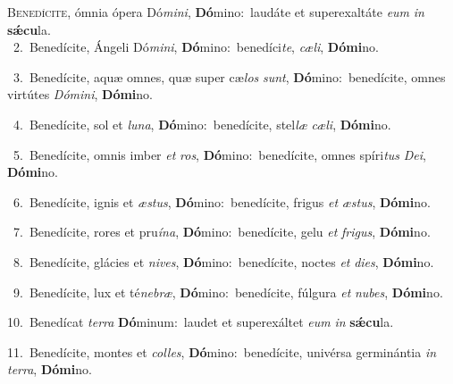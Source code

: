 \lettrine{\initial\textcolor{\initialcolor}{B}}{enedícite,} ómnia ópera Dó\-\textit{mi}\-\textit{ni}, \textbf{Dó}\-mino:~\star laudáte et superexaltáte \textit{e}\-\textit{um} \textit{in} \textbf{sǽ}\-\textbf{cu}la.\\
{\numbfont\textcolor{\numbcolor}{~2.}}~Benedícite, Ángeli Dó\-\textit{mi}\-\textit{ni}, \textbf{Dó}\-mino:~\star benedíci\-\textit{te}\-, \textit{cæ}\-\textit{li}, \textbf{Dó}\-\textbf{mi}no.\par
{\numbfont\textcolor{\numbcolor}{~3.}}~Benedícite, aquæ omnes, quæ super cæ\textit{los} \textit{sunt}\-, \textbf{Dó}\-mino:~\star benedícite, omnes virtútes \textit{Dó}\-\textit{mi}\textit{ni}, \textbf{Dó}\-\textbf{mi}no.\par
{\numbfont\textcolor{\numbcolor}{~4.}}~Benedícite, sol et \textit{lu}\-\textit{na}, \textbf{Dó}\-mino:~\star benedícite, stel\textit{læ} \textit{cæ}\-\textit{li}, \textbf{Dó}\-\textbf{mi}no.\par
{\numbfont\textcolor{\numbcolor}{~5.}}~Benedícite, omnis imber \textit{et} \textit{ros}\-, \textbf{Dó}\-mino:~\star benedícite, omnes spíri\textit{tus} \textit{De}\-\textit{i}, \textbf{Dó}\-\textbf{mi}no.\par
{\numbfont\textcolor{\numbcolor}{~6.}}~Benedícite, ignis et \textit{æs}\-\textit{tus}, \textbf{Dó}\-mino:~\star benedícite, frigus \textit{et} \textit{æs}\-\textit{tus}, \textbf{Dó}\-\textbf{mi}no.\par
{\numbfont\textcolor{\numbcolor}{~7.}}~Benedícite, rores et pru\-\textit{í}\-\textit{na}, \textbf{Dó}\-mino:~\star benedícite, gelu \textit{et} \textit{fri}\-\textit{gus}, \textbf{Dó}\-\textbf{mi}no.\par
{\numbfont\textcolor{\numbcolor}{~8.}}~Benedícite, glácies et \textit{ni}\-\textit{ves}, \textbf{Dó}\-mino:~\star benedícite, noctes \textit{et} \textit{di}\-\textit{es}, \textbf{Dó}\-\textbf{mi}no.\par
{\numbfont\textcolor{\numbcolor}{~9.}}~Benedícite, lux et té\-\textit{ne}\-\textit{bræ}, \textbf{Dó}\-mino:~\star benedícite, fúlgura \textit{et} \textit{nu}\-\textit{bes}, \textbf{Dó}\-\textbf{mi}no.\par
{\numbfont\textcolor{\numbcolor}{10.}}~Benedícat \textit{ter}\-\textit{ra} \textbf{Dó}\-minum:~\star laudet et superexáltet \textit{e}\-\textit{um} \textit{in} \textbf{sǽ}\-\textbf{cu}la.\par
{\numbfont\textcolor{\numbcolor}{11.}}~Benedícite, montes et \textit{col}\-\textit{les}, \textbf{Dó}\-mino:~\star benedícite, univérsa germinántia \textit{in} \textit{ter}\-\textit{ra}, \textbf{Dó}\-\textbf{mi}no.\par
